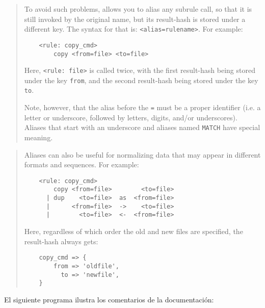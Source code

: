 
\begin{it}\begin{quotation}
To avoid such problems,  allows you to alias any
subrule call, so that it is still invoked by the original name, but its
result-hash is stored under a different key. The syntax for that is:
\verb|<alias=rulename>|. For example:

\begin{verbatim}
    <rule: copy_cmd>
        copy <from=file> <to=file>
\end{verbatim}

Here, \verb|<rule: file>| is called twice, with the first result-hash
being stored under the key \verb'from', and the second result-hash being
stored under the key \verb'to'.

Note, however, that the alias before the \verb|=| must be a proper identifier
(i.e. a letter or underscore, followed by letters, digits, and/or
underscores). Aliases that start with an underscore and aliases named
\verb|MATCH| have special meaning.
\end{quotation}\end{it}


\begin{it}\begin{quotation}
Aliases can also be useful for normalizing data that may appear in
different formats and sequences. For example:

\begin{verbatim}
    <rule: copy_cmd>
        copy <from=file>        <to=file>
      | dup    <to=file>  as  <from=file>
      |      <from=file>  ->    <to=file>
      |        <to=file>  <-  <from=file>

\end{verbatim}

Here, regardless of which order the old and new files are specified,
the result-hash always gets:

\begin{verbatim}
    copy_cmd => {
        from => 'oldfile',
          to => 'newfile',
    }
\end{verbatim}
\end{quotation}\end{it}


El siguiente programa ilustra los comentarios de la documentación:

